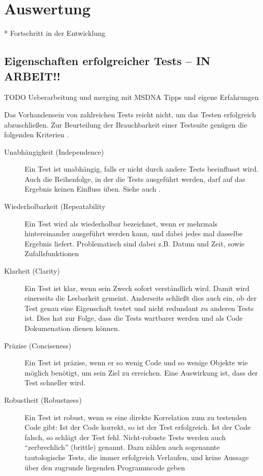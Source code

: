 \section{Auswertung}

* Fortschritt in der Entwicklung










\subsection{Eigenschaften erfolgreicher Tests -- IN ARBEIT!!}

TODO Ueberarbeitung und merging mit MSDNA Tipps und eigene Erfahrungen

Das Vorhandensein von zahlreichen Tests reicht nicht, um das Testen erfolgreich abzuschließen. Zur Beurteilung der Brauchbarkeit einer Testsuite genügen die folgenden Kriterien \cite[S.272-279]{rappin_rails_2011}.



\begin{description}
 \item[Unabhängigkeit (Independence)] Ein Test ist unabhängig, falls er nicht durch andere Tests beeinflusst wird. Auch die Reihenfolge, in der die Tests ausgeführt werden, darf auf das Ergebnis keinen Einfluss üben. Siehe auch \citep{beck_test_2002}.
 \item[Wiederholbarkeit (Repeatability] Ein Test wird als wiederholbar bezeichnet, wenn er mehrmals hintereinander ausgeführt werden kann, und dabei jedes mal dasselbe Ergebnis liefert. Problematisch sind dabei z.B. Datum und Zeit, sowie Zufallsfunktionen
 \item[Klarheit (Clarity)] Ein Test ist klar, wenn sein Zweck sofort verständlich wird. Damit wird einerseits die Lesbarkeit gemeint. Anderseits schließt dies auch ein, ob der Test genau eine Eigenschaft testet und nicht redundant zu anderen Tests ist. Dies hat zur Folge, dass die Tests wartbarer werden und als Code Dokumenation dienen können.
 \item[Präzise (Conciseness)] Ein Test ist präzise, wenn er so wenig Code und so wenige Objekte wie möglich benötigt, um sein Ziel zu erreichen. Eine Auswirkung ist, dass der Test schneller wird.
 \item[Robustheit (Robustness)] Ein Test ist robust, wenn es eine direkte Korrelation zum zu testenden Code gibt: Ist der Code korrekt, so ist der Test erfolgreich. Ist der Code falsch, so schlägt der Test fehl. Nicht-robuste Tests werden auch "`zerbrechlich"' (brittle) genannt. Dazu zählen auch sogenannte tautologische Tests, die immer erfolgreich Verlaufen, und keine Aussage über den zugrunde liegenden Programmcode geben
 \end{description}

